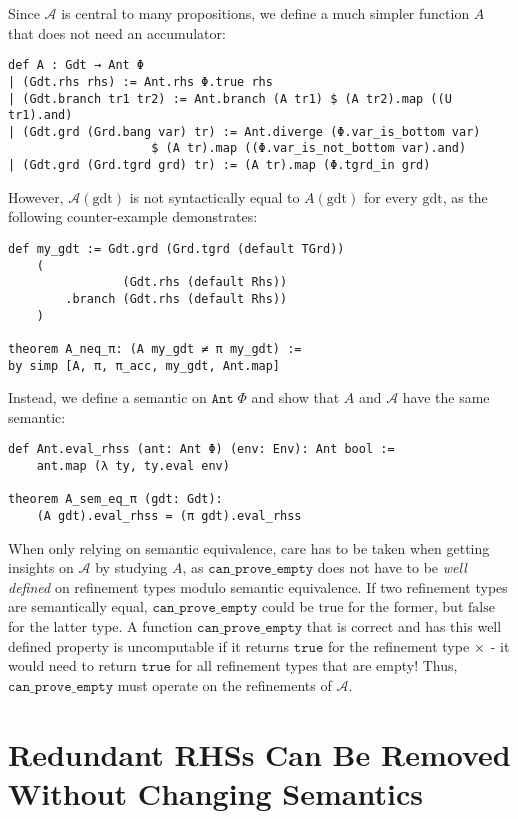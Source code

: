 Since $\mathcal{A}$ is central to many propositions, we define a much simpler function $A$ that does not need an accumulator:

\begin{verbatim}
def A : Gdt → Ant Φ
| (Gdt.rhs rhs) := Ant.rhs Φ.true rhs
| (Gdt.branch tr1 tr2) := Ant.branch (A tr1) $ (A tr2).map ((U tr1).and)
| (Gdt.grd (Grd.bang var) tr) := Ant.diverge (Φ.var_is_bottom var)
                    $ (A tr).map ((Φ.var_is_not_bottom var).and)
| (Gdt.grd (Grd.tgrd grd) tr) := (A tr).map (Φ.tgrd_in grd)
\end{verbatim}

However, $\mathcal{A}(\mathrm{gdt})$ is not syntactically equal to $A(\mathrm{gdt})$ for every $\mathrm{gdt}$, as the following counter-example demonstrates:

\begin{verbatim}
def my_gdt := Gdt.grd (Grd.tgrd (default TGrd))
    (
                (Gdt.rhs (default Rhs))
        .branch (Gdt.rhs (default Rhs))
    )

theorem A_neq_π: (A my_gdt ≠ π my_gdt) :=
by simp [A, π, π_acc, my_gdt, Ant.map]
\end{verbatim}

Instead, we define a semantic on $\mathtt{Ant}\;\Phi$ and show that $A$ and $\mathcal{A}$ have the same semantic:
\begin{verbatim}
def Ant.eval_rhss (ant: Ant Φ) (env: Env): Ant bool :=
    ant.map (λ ty, ty.eval env)
    
theorem A_sem_eq_π (gdt: Gdt):
    (A gdt).eval_rhss = (π gdt).eval_rhss
\end{verbatim}

When only relying on semantic equivalence, care has to be taken when getting insights on $\mathcal{A}$ by studying $A$,
as $\mathtt{can\_prove\_empty}$ does not have to be \textit{well defined}
on refinement types modulo semantic equivalence. If two refinement types are semantically equal,
$\mathtt{can\_prove\_empty}$ could be $\mathrm{true}$ for the former, but $\mathrm{false}$ for the latter type.
A function $\mathtt{can\_prove\_empty}$ that is correct and has this well defined property is uncomputable if it returns $\mathtt{true}$ for the refinement type $\times$ - it would need to return $\mathtt{true}$ for all refinement types that are empty!
Thus, $\mathtt{can\_prove\_empty}$ must operate on the refinements of $\mathcal{A}$.

\section{Redundant RHSs Can Be Removed Without Changing Semantics}\label{sec:proofRedRemovable}

